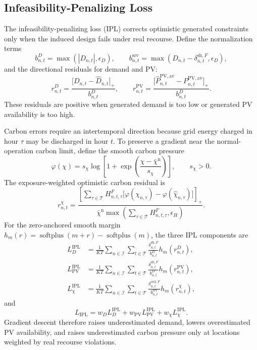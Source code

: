 \documentclass[times]{elsarticle}
\begin{document}
\subsection{Infeasibility-Penalizing Loss}

The infeasibility-penalizing loss (IPL) corrects optimistic generated
constraints only when the induced design fails under real recourse. Define the
normalization terms
\begin{equation}
b^D_{n,t}=\max(|D_{n,t}|,\epsilon_D),\qquad
b^{\mathrm{srv}}_{n,t}=\max(D_{n,t}-\delta^{\mathrm{sh},F}_{n,t},\epsilon_D),
\label{eq:loss_scales}
\end{equation}
and the directional residuals for demand and PV:
\begin{equation}
r^D_{n,t}=\frac{\bigl[D_{n,t}-\widehat D_{n,t}\bigr]_+}{b^D_{n,t}},
\qquad
r^{\mathrm{PV}}_{n,t}=\frac{\bigl[\widehat P^{\mathrm{PV,av}}_{n,t}
-P^{\mathrm{PV,av}}_{n,t}\bigr]_+}
{b^D_{n,t}}.
\label{eq:load_pv_direction}
\end{equation}
These residuals are positive when generated demand is too low or generated PV
availability is too high.

Carbon errors require an intertemporal direction because grid energy charged in
hour $\tau$ may be discharged in hour $t$. To preserve a gradient near the
normal-operation carbon limit, define the smooth carbon pressure
\begin{equation}
\varphi(\chi)=s_\chi\log\left[1+
\exp\left(\frac{\chi-\bar\chi^{\mathrm n}}{s_\chi}\right)\right],
\qquad s_\chi>0.
\label{eq:pressure}
\end{equation}
The exposure-weighted optimistic carbon residual is
\begin{equation}
r^\chi_{n,t}=
\frac{\left[\sum_{\tau\in\mathcal T}H^F_{n,t,\tau}
\bigl[\varphi(\chi_{n,\tau})-\varphi(\widehat\chi_{n,\tau})\bigr]\right]_+}
{\bar\chi^{\mathrm n}\max(\sum_{\tau\in\mathcal T}H^F_{n,t,\tau},\epsilon_H)}.
\label{eq:carbon_direction}
\end{equation}
For the zero-anchored smooth margin
$h_m(r)=\operatorname{softplus}(m+r)-\operatorname{softplus}(m)$, the three IPL
components are
\begin{align}
L_D^{\mathrm{IPL}}&=\frac1{KT}\sum_{n\in\mathcal I}
\sum_{t\in\mathcal T}
\frac{\delta^{\mathrm{sh},F}_{n,t}}{b^D_{n,t}}h_m(r^D_{n,t}),
\label{eq:ipl_load}\\
L_{\mathrm{PV}}^{\mathrm{IPL}}&=\frac1{KT}\sum_{n\in\mathcal I}
\sum_{t\in\mathcal T}
\frac{\delta^{\mathrm{sh},F}_{n,t}}{b^D_{n,t}}h_m(r^{\mathrm{PV}}_{n,t}),
\label{eq:ipl_pv}\\
L_\chi^{\mathrm{IPL}}&=\frac1{KT}\sum_{n\in\mathcal I}
\sum_{t\in\mathcal T}
\frac{\delta^{\mathrm{co2},F}_{n,t}}{b^{\mathrm{srv}}_{n,t}}h_m(r^\chi_{n,t}),
\label{eq:ipl_carbon}
\end{align}
and
\begin{equation}
L_{\mathrm{IPL}}=w_D L_D^{\mathrm{IPL}}
+w_{\mathrm{PV}}L_{\mathrm{PV}}^{\mathrm{IPL}}
+w_\chi L_\chi^{\mathrm{IPL}}.
\label{eq:ipl}
\end{equation}
Gradient descent therefore raises underestimated demand, lowers overestimated
PV availability, and raises underestimated carbon pressure only at locations
weighted by real recourse violations.
\end{document}
